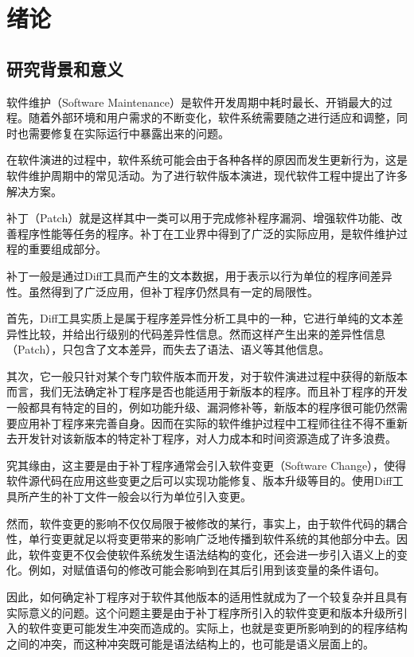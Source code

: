 \chapter{绪论}
\section{研究背景和意义}

软件维护（Software Maintenance）是软件开发周期中耗时最长、开销最大的过程\cite{lehnert2011review}。随着外部环境和用户需求的不断变化，软件系统需要随之进行适应和调整，同时也需要修复在实际运行中暴露出来的问题。

在软件演进的过程中，软件系统可能会由于各种各样的原因而发生更新行为，这是软件维护周期中的常见活动\cite{pigoski1996practical}。为了进行软件版本演进，现代软件工程中提出了许多解决方案。

补丁（Patch）就是这样其中一类可以用于完成修补程序漏洞、增强软件功能、改善程序性能等任务的程序。补丁在工业界中得到了广泛的实际应用，是软件维护过程的重要组成部分\cite{le2014patch}。

补丁一般是通过Diff工具而产生的文本数据\cite{hunt1976algorithm}，用于表示以行为单位的程序间差异性。虽然得到了广泛应用，但补丁程序仍然具有一定的局限性。

首先，Diff工具实质上是属于程序差异性分析工具中的一种，它进行单纯的文本差异性比较，并给出行级别的代码差异性信息。然而这样产生出来的差异性信息（Patch），只包含了文本差异，而失去了语法、语义等其他信息。

其次，它一般只针对某个专门软件版本而开发，对于软件演进过程中获得的新版本而言，我们无法确定补丁程序是否也能适用于新版本的程序。而且补丁程序的开发一般都具有特定的目的，例如功能升级、漏洞修补等，新版本的程序很可能仍然需要应用补丁程序来完善自身。因而在实际的软件维护过程中工程师往往不得不重新去开发针对该新版本的特定补丁程序，对人力成本和时间资源造成了许多浪费。

究其缘由，这主要是由于补丁程序通常会引入软件变更（Software Change）\cite{buckley2005towards}，使得软件源代码在应用这些变更之后可以实现功能修复、版本升级等目的。使用Diff工具所产生的补丁文件一般会以行为单位引入变更。

然而，软件变更的影响不仅仅局限于被修改的某行，事实上，由于软件代码的耦合性，单行变更就足以将变更带来的影响广泛地传播到软件系统的其他部分中去\cite{wilkerson2012software,tao2012software}。因此，软件变更不仅会使软件系统发生语法结构的变化，还会进一步引入语义上的变化。例如，对赋值语句的修改可能会影响到在其后引用到该变量的条件语句。

因此，如何确定补丁程序对于软件其他版本的适用性就成为了一个较复杂并且具有实际意义的问题。这个问题主要是由于补丁程序所引入的软件变更和版本升级所引入的软件变更可能发生冲突而造成的。实际上，也就是变更所影响到的的程序结构之间的冲突，而这种冲突既可能是语法结构上的，也可能是语义层面上的。

